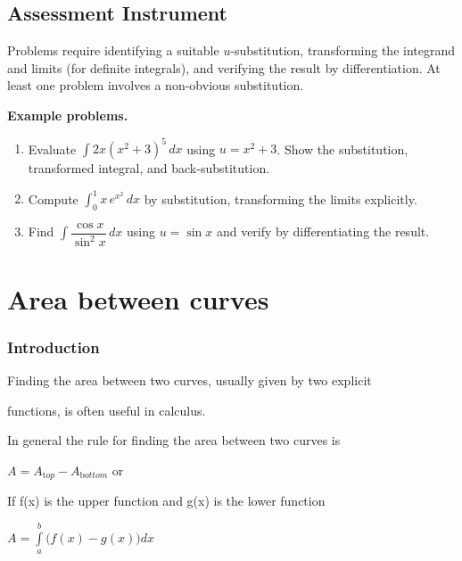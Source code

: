 \subsection{Assessment Instrument}
\label{ssec:subs-63bd}

Problems require identifying a suitable $u$-substitution, transforming the integrand and limits (for definite integrals), and verifying the result by differentiation. At least one problem involves a non-obvious substitution.

\textbf{Example problems.}

\begin{enumerate}
    \item Evaluate $\int 2x(x^2+3)^5\,dx$ using $u = x^2+3$. Show the substitution, transformed integral, and back-substitution.
    \item Compute $\int_0^1 x\,e^{x^2}\,dx$ by substitution, transforming the limits explicitly.
    \item Find $\int\dfrac{\cos x}{\sin^2 x}\,dx$ using $u = \sin x$ and verify by differentiating the result.
\end{enumerate}

\section{Area between curves}
\label{sec:area-3a2e}


\subsubsection{Introduction}
\label{sss:intr-8800}


Finding the area between two curves, usually given by two explicit

functions, is often useful in calculus.


In general the rule for finding the area between two curves is


$A=A _{\mathrm top}-A _{\mathrm bottom}$ or


If f(x) is the upper function and g(x) is the lower function


$A=\int\limits_a^b \bigl(f(x)-g(x)\bigr)dx$


